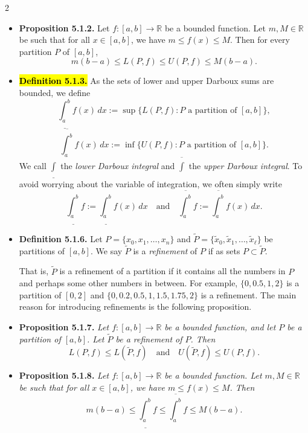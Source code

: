 \documentclass[a4paper,10pt]{article}
\begin{document}
\begin{multicols}{2}
\begin{itemize}
    \item \textbf{Proposition 5.1.2.} Let \( f : [a, b] \to \mathbb{R} \) be a bounded function. Let \( m, M \in \mathbb{R} \) be such that for all \( x \in [a, b] \), we have \( m \le f(x) \le M \). Then for every partition \( P \) of \( [a, b] \),
    \[
    m(b - a) \le L(P, f) \le U(P, f) \le M(b - a).\]

    \item \hl{\textbf{Definition 5.1.3.}} As the sets of lower and upper Darboux sums are bounded, we define
    \[
    \underline{\int_a^b} f(x) \, dx := \sup \{ L(P, f) : P \text{ a partition of } [a, b] \},
    \]
    \[
    \overline{\int_a^b} f(x) \, dx := \inf \{ U(P, f) : P \text{ a partition of } [a, b] \}.
    \]
    We call \( \underline{\int} \) the \textit{lower Darboux integral} and \( \overline{\int} \) the \textit{upper Darboux integral}. To avoid worrying about the variable of integration, we often simply write
    \[
    \underline{\int_a^b} f := \underline{\int_a^b} f(x) \, dx
    \quad \text{and} \quad
    \overline{\int_a^b} f := \overline{\int_a^b} f(x) \, dx.
    \]

    \item \textbf{Definition 5.1.6.} Let \( P = \{x_0, x_1, \ldots, x_n\} \) and \( \widetilde{P} = \{\widetilde{x}_0, \widetilde{x}_1, \ldots, \widetilde{x}_\ell\} \) be partitions of \([a,b]\). We say \( \widetilde{P} \) is a \textit{refinement} of \( P \) if as sets \( P \subset \widetilde{P} \).

    That is, \( \widetilde{P} \) is a refinement of a partition if it contains all the numbers in \( P \) and perhaps some other numbers in between. For example, \(\{0, 0.5, 1, 2\}\) is a partition of \([0,2]\) and \(\{0, 0.2, 0.5, 1, 1.5, 1.75, 2\}\) is a refinement. The main reason for introducing refinements is the following proposition.
    
    \item \textbf{Proposition 5.1.7.} \textit{Let \( f : [a,b] \to \mathbb{R} \) be a bounded function, and let \( P \) be a partition of \([a,b]\). Let \( \widetilde{P} \) be a refinement of \( P \). Then}
    \[
    L(P,f) \leq L(\widetilde{P}, f) \quad \text{and} \quad U(\widetilde{P}, f) \leq U(P, f).
    \]

    \item \textbf{Proposition 5.1.8.} \textit{Let \( f : [a,b] \to \mathbb{R} \) be a bounded function. Let \( m, M \in \mathbb{R} \) be such that for all \( x \in [a,b] \), we have \( m \leq f(x) \leq M \). Then}
    \[
    m(b - a) \leq \underline{\int_a^b} f \leq \overline{\int_a^b} f \leq M(b - a).
    \]


\end{itemize}
\end{multicols}
\end{document}
